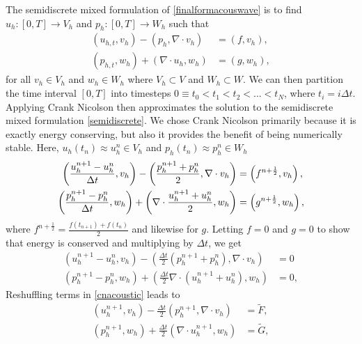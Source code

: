 \documentclass[11pt]{article}
\begin{document}
The semidiscrete mixed formulation of \eqref{finalformacouswave} is to find $u_h:[0,T] \rightarrow V_h$ and $p_h:[0,T] \rightarrow W_h$ such that
\begin{equation}\label{semidiscrete}
\begin{split}
(u_{h,t},v_h) - (p_h,\nabla \cdot v_h) &= (f,v_h),\\
(p_{h,t}, w_h) + (\nabla \cdot u_h,w_h) &= (g,w_h),
\end{split}
\end{equation}
for all $v_h \in V_h$ and $w_h \in W_h$ where $V_h \subset V$ and $W_h \subset W$.
We can then partition the time interval $[0,T]$ into timesteps $0 \equiv t_0 < t_1 < t_2 < ... < t_N$, where $t_i = i\Delta t$. %
Applying Crank Nicolson then approximates the solution to the semidiscrete mixed formulation \eqref{semidiscrete}. We chose Crank Nicolson primarily because it is exactly energy conserving, but also it provides the benefit of being numerically stable. Here, $u_h(t_n) \approx u^n_h \in V_h$ and $p_h(t_n) \approx p^n_h \in W_h$
\begin{equation}{\label{cnacoustic}}
\begin{split}
\left(\frac{u^{n+1}_h-u^n_h}{\Delta t},v_h\right)-\left(\frac{p^{n+1}_h+p^n_h}{2},\nabla \cdot v_h\right) &= \left(f^{n+\frac{1}{2}},v_h\right), \\
\left(\frac{p^{n+1}_h-p^n_h}{\Delta t},w_h\right)+\left(\nabla \cdot \frac{u^{n+1}_h+u^n_h}{2},w_h\right) &= \left(g^{n+\frac{1}{2}},w_h\right),
\end{split}
\end{equation}
where $f^{n+\frac{1}{2}} = \frac{f(t_{n+1})+f(t_n)}{2}$ and likewise for $g$. Letting $f = 0$ and $g=0$ to show that energy is conserved and multiplying by $\Delta t$, we get
\begin{equation}
\begin{split}
\left(u^{n+1}_h-u^n_h,v_h\right)-\left(\frac{\Delta t}{2}\left(p^{n+1}_h+p^n_h\right),\nabla \cdot v_h\right) &= 0 \\
\left(p^{n+1}_h-p^n_h,w_h\right)+\left(\frac{\Delta t}{2}\nabla \cdot\left(u^{n+1}_h+u^n_h\right),w_h\right) &= 0,
\end{split}
\end{equation}
Reshuffling terms in \eqref{cnacoustic} leads to 
\begin{equation}\label{discretizationfinal}
\begin{split}
\left(u^{n+1}_h,v_h\right) - \frac{\Delta t}{2}\left(p^{n+1}_h, \nabla \cdot v_h\right) &= \tilde{F}, \\
\left(p^{n+1}_h,w_h\right) + \frac{\Delta t}{2}\left(\nabla \cdot u^{n+1}_h,w_h\right) &= \tilde{G},
\end{split}
\end{equation}
\end{document}
